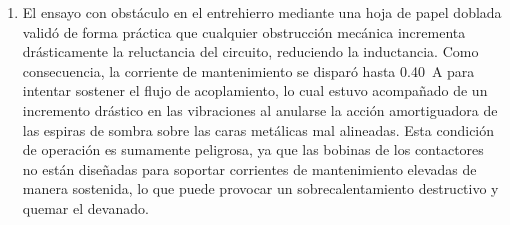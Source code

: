 \begin{enumerate}
    \item El ensayo con obstáculo en el entrehierro mediante una hoja de papel doblada validó de forma práctica que cualquier obstrucción mecánica incrementa drásticamente la reluctancia del circuito, reduciendo la inductancia. Como consecuencia, la corriente de mantenimiento se disparó hasta \qty{0,40}{\ampere} para intentar sostener el flujo de acoplamiento, lo cual estuvo acompañado de un incremento drástico en las vibraciones al anularse la acción amortiguadora de las espiras de sombra sobre las caras metálicas mal alineadas. Esta condición de operación es sumamente peligrosa, ya que las bobinas de los contactores no están diseñadas para soportar corrientes de mantenimiento elevadas de manera sostenida, lo que puede provocar un sobrecalentamiento destructivo y quemar el devanado.
\end{enumerate}
